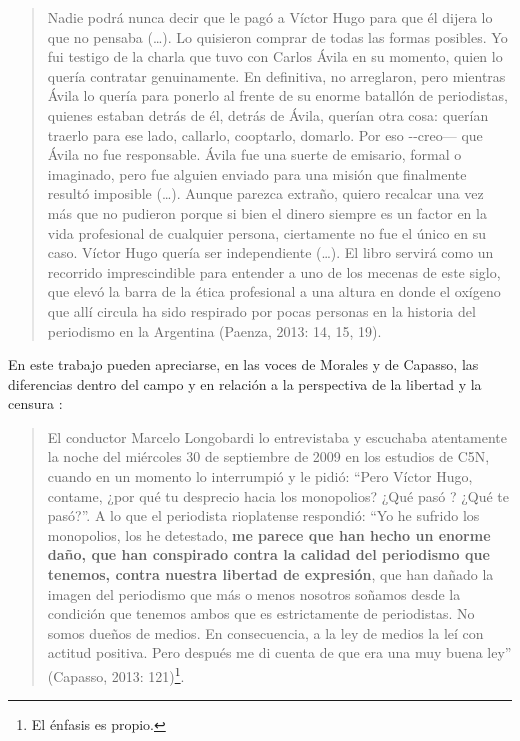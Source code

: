 \begin{quote}
Nadie podrá nunca decir que le pagó a Víctor Hugo para que él dijera lo que no pensaba (\ldots). Lo quisieron comprar de todas las formas posibles. Yo fui testigo de la charla que tuvo con Carlos Ávila en su momento, quien lo quería contratar genuinamente. En definitiva, no arreglaron, pero mientras Ávila lo quería para ponerlo al frente de su enorme batallón de periodistas, quienes estaban detrás de él, detrás de Ávila, querían otra cosa: querían traerlo para ese lado, callarlo, cooptarlo, domarlo. Por eso -\/-creo--- que Ávila no fue responsable. Ávila fue una suerte de emisario, formal o imaginado, pero fue alguien enviado para una misión que finalmente resultó imposible (\ldots). Aunque parezca extraño, quiero recalcar una vez más que no pudieron porque si bien el dinero siempre es un factor en la vida profesional de cualquier persona, ciertamente no fue el único en su caso. Víctor Hugo quería ser independiente (\ldots). El libro servirá como un recorrido imprescindible para entender a uno de los mecenas de este siglo, que elevó la barra de la ética profesional a una altura en donde el oxígeno que allí circula ha sido respirado por pocas personas en la historia del periodismo en la Argentina (Paenza, 2013: 14, 15, 19).
\end{quote}

En este trabajo pueden apreciarse, en las voces de Morales y de Capasso, las diferencias dentro del campo y en relación a la perspectiva de la libertad y la censura :

\begin{quote}
El conductor Marcelo Longobardi lo entrevistaba y escuchaba atentamente la noche del miércoles 30 de septiembre de 2009 en los estudios de C5N, cuando en un momento lo interrumpió y le pidió: \enquote{Pero Víctor Hugo, contame, ¿por qué tu desprecio hacia los monopolios? ¿Qué pasó ? ¿Qué te pasó?}. A lo que el periodista rioplatense respondió: \enquote{Yo he sufrido los monopolios, los he detestado, \textbf{me parece que han hecho un enorme daño, que han conspirado contra la calidad del periodismo que tenemos, contra nuestra libertad de expresión}, que han dañado la imagen del periodismo que más o menos nosotros soñamos desde la condición que tenemos ambos que es estrictamente de periodistas. No somos dueños de medios. En consecuencia, a la ley de medios la leí con actitud positiva. Pero después me di cuenta de que era una muy buena ley} (Capasso, 2013: 121)\footnote{El énfasis es propio.}.
\end{quote}


